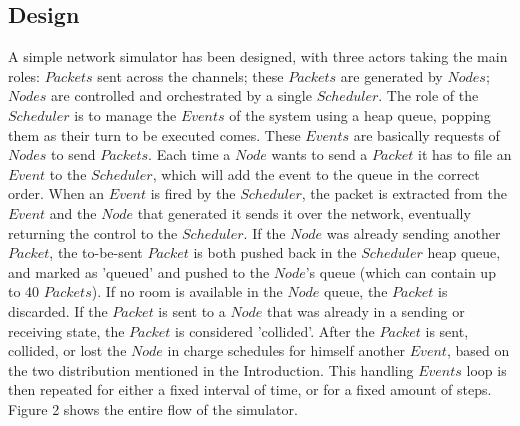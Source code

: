 \documentclass[conference]{IEEEtran}
\begin{document}
\subsection{Design}\label{sec:design}
A simple network simulator has been designed, with three actors taking the main roles: \(Packets\) sent across the channels; these \(Packets\) are generated by \(Nodes\); \(Nodes\) are controlled and orchestrated by a single \(Scheduler\). The role of the \(Scheduler\) is to manage the \(Events\) of the system using a heap queue, popping them as their turn to be executed comes. These \(Events\) are basically requests of \(Nodes\) to send \(Packets\). Each time a \(Node\) wants to send a \(Packet\) it has to file an \(Event\) to the \(Scheduler\), which will add the event to the queue in the correct order. When an \(Event\) is fired by the \(Scheduler\), the packet is extracted from the \(Event\) and the \(Node\) that generated it sends it over the network, eventually returning the control to the \(Scheduler\). If the \(Node\) was already sending another \(Packet\), the to-be-sent \(Packet\) is both pushed back in the \(Scheduler\) heap queue, and marked as 'queued' and pushed to the \(Node\)’s queue (which can contain up to 40 \(Packets\)). If no room is available in the \(Node\) queue, the \(Packet\) is discarded. If the \(Packet\) is sent to a \(Node\) that was already in a sending or receiving state, the \(Packet\) is considered 'collided'. After the \(Packet\) is sent, collided, or lost the \(Node\) in charge schedules for himself another \(Event\), based on the two distribution mentioned in the Introduction. This handling \(Events\) loop is then repeated for either a fixed interval of time, or for a fixed amount of steps. Figure 2 shows the entire flow of the simulator.
\end{document}

